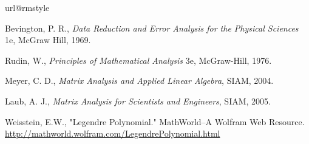 \begin{thebibliography}{1}
\providecommand{\url}[1]{#1}
\csname url@rmstyle\endcsname
\providecommand{\newblock}{\relax}
\providecommand{\bibinfo}[2]{#2}
\providecommand\BIBentrySTDinterwordspacing{\spaceskip=0pt\relax}
\providecommand\BIBentryALTinterwordstretchfactor{4}
\providecommand\BIBentryALTinterwordspacing{\spaceskip=\fontdimen2\font plus
\BIBentryALTinterwordstretchfactor\fontdimen3\font minus
  \fontdimen4\font\relax}
\providecommand\BIBforeignlanguage[2]{{%
\expandafter\ifx\csname l@#1\endcsname\relax
\typeout{** WARNING: IEEEtran.bst: No hyphenation pattern has been}%
\typeout{** loaded for the language `#1'. Using the pattern for}%
\typeout{** the default language instead.}%
\else
\language=\csname l@#1\endcsname
\fi
#2}}

%
%
%

 Bevington, P. R.,
\emph{Data Reduction and Error Analysis for the Physical Sciences} 1e, 
McGraw Hill, 1969.

 Rudin, W.,
\emph{Principles of Mathematical Analysis} 3e,
McGraw-Hill, 1976.

 Meyer, C. D.,
\emph{Matrix Analysis and Applied Linear Algebra},
SIAM, 2004.

 Laub, A. J.,
\emph{Matrix Analysis for Scientists and Engineers},
SIAM, 2005.

 Weisstein, E.W.,
"Legendre Polynomial."
MathWorld--A Wolfram Web Resource. \href{http://mathworld.wolfram.com/LegendrePolynomial.html}{http://mathworld.wolfram.com/LegendrePolynomial.html}

%

\end{thebibliography}
